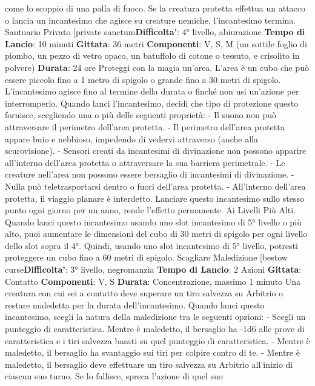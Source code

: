 \begin{multicols}{2}
come lo scoppio di una palla di fuoco.
Se la creatura protetta effettua un attacco o lancia un
incantesimo che agisce su creature nemiche,
l’incantesimo termina.
Santuario Privato
[private sanctum\textbf{Difficolta'}:
4° livello, abiurazione
\textbf{Tempo di Lancio}: 10 minuti
\textbf{Gittata}: 36 metri
\textbf{Componenti}: V, S, M (un sottile foglio di piombo, un
pezzo di vetro opaco, un batuffolo di cotone o tessuto, e
crisolito in polvere)
\textbf{Durata}: 24 ore
Proteggi con la magia un’area. L’area è un cubo che
può essere piccolo fino a 1 metro di spigolo o grande
fino a 30 metri di spigolo. L’incantesimo agisce fino al
termine della durata o finché non usi un’azione per
interromperlo.
Quando lanci l’incantesimo, decidi che tipo di
protezione questo fornisce, scegliendo una o più delle
seguenti proprietà:
- Il suono non può attraversare il perimetro dell’area
protetta.
- Il perimetro dell’area protetta appare buio e
nebbioso, impedendo di vedervi attraverso (anche
alla scurovisione).
- Sensori creati da incantesimi di divinazione non
possono apparire all’interno dell’area protetta o
attraversare la sua barriera perimetrale.
- Le creature nell’area non possono essere bersaglio
di incantesimi di divinazione.
- Nulla può teletrasportarsi dentro o fuori dell’area
protetta.
- All’interno dell’area protetta, il viaggio planare è
interdetto.
Lanciare questo incantesimo sullo stesso punto ogni
giorno per un anno, rende l’effetto permanente.
Ai Livelli Più Alti. Quando lanci questo incantesimo
usando uno slot incantesimo di 5° livello o più alto, puoi
aumentare le dimensioni del cubo di 30 metri di spigolo
per ogni livello dello slot sopra il 4°. Quindi, usando uno
slot incantesimo di 5° livello, potresti proteggere un
cubo fino a 60 metri di spigolo.
Scagliare Maledizione
[bestow curse\textbf{Difficolta'}:
3° livello, negromanzia
\textbf{Tempo di Lancio}: 2 Azioni
\textbf{Gittata}: Contatto
\textbf{Componenti}: V, S
\textbf{Durata}: Concentrazione, massimo 1 minuto
Una creatura con cui sei a contatto deve superare un
tiro salvezza su Arbitrio o restare maledetta per la
durata dell’incantesimo. Quando lanci questo
incantesimo, scegli la natura della maledizione tra le
seguenti opzioni:
- Scegli un punteggio di caratteristica. Mentre è
maledetto, il bersaglio ha -1d6 alle prove di
caratteristica e i tiri salvezza basati su quel
punteggio di caratteristica.
- Mentre è maledetto, il bersaglio ha svantaggio sui
tiri per colpire contro di te.
- Mentre è maledetto, il bersaglio deve effettuare un
tiro salvezza su Arbitrio all’inizio di ciascun suo
turno. Se lo fallisce, spreca l’azione di quel suo

\end{multicols}
